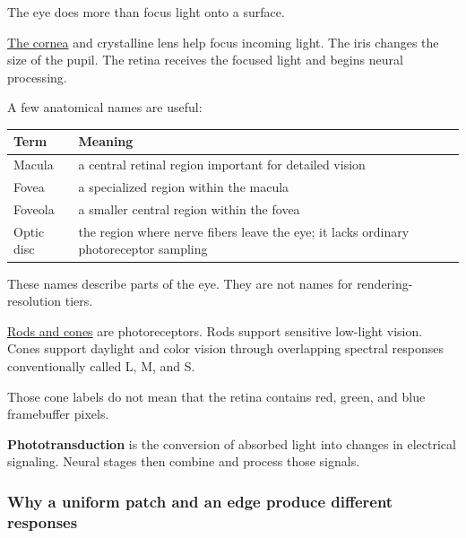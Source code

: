 The eye does more than focus light onto a surface.

\hyperref[appendix-f90cee1be7a4]{The cornea} and crystalline lens help focus incoming light. The iris changes the size of the pupil. The retina receives the focused light and begins neural processing.

A few anatomical names are useful:

{\def\LTcaptype{none} %
\begin{longtable}[]{@{}
  >{\raggedright\arraybackslash}p{}
  >{\raggedright\arraybackslash}p{}@{}}
\toprule\noalign{}
\begin{minipage}[b]{\linewidth}\raggedright
Term
\end{minipage} & \begin{minipage}[b]{\linewidth}\raggedright
Meaning
\end{minipage} \\
\midrule\noalign{}
\endhead
\bottomrule\noalign{}
\endlastfoot
Macula & a central retinal region important for detailed vision \\
Fovea & a specialized region within the macula \\
Foveola & a smaller central region within the fovea \\
Optic disc & the region where nerve fibers leave the eye; it lacks ordinary photoreceptor sampling \\
\end{longtable}
}

These names describe parts of the eye. They are not names for rendering-resolution tiers.

\hyperref[appendix-7281c15ac44a]{Rods and cones} are photoreceptors. Rods support sensitive low-light vision. Cones support daylight and color vision through overlapping spectral responses conventionally called L, M, and S.

Those cone labels do not mean that the retina contains red, green, and blue framebuffer pixels.

\textbf{Phototransduction} is the conversion of absorbed light into changes in electrical signaling. Neural stages then combine and process those signals.

\subsubsection{Why a uniform patch and an edge produce different responses}\label{04-visual-computing-ii-ch043-why-a-uniform-patch-and-an-edge-produce-different-responses}

